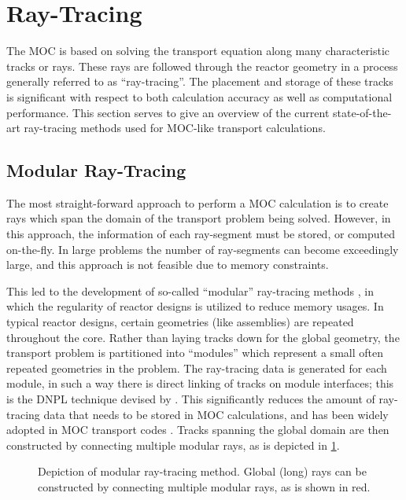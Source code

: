 {    \section{Ray-Tracing}{\label{sec:MOC:Ray-Tracing}
      The \acf{MOC} \cite{Askew1972} is based on solving the transport equation along many characteristic tracks or rays.
      These rays are followed through the reactor geometry in a process generally referred to as ``ray-tracing''.
      The placement and storage of these tracks is significant with respect to both calculation accuracy as well as computational performance.
      This section serves to give an overview of the current state-of-the-art ray-tracing methods used for \ac{MOC}-like transport calculations.

      \subsection{Modular Ray-Tracing}{\label{ssec:RT:Modular Ray-Tracing}
        The most straight-forward approach to perform a \ac{MOC} calculation is to create rays which span the domain of the transport problem being solved.
        However, in this approach, the information of each ray-segment must be stored, or computed on-the-fly.
        In large problems the number of ray-segments can become exceedingly large, and this approach is not feasible due to memory constraints.

        This led to the development of so-called ``modular'' ray-tracing methods \cite{Filippone1980,Saji2000,Wu2003,Kochunas2013}, in which the regularity of reactor designs is utilized to reduce memory usages.
        In typical reactor designs, certain geometries (like assemblies) are repeated throughout the core.
        Rather than laying tracks down for the global geometry, the transport problem is partitioned into ``modules'' which represent a small often repeated geometries in the problem.
        The ray-tracing data is generated for each module, in such a way there is direct linking of tracks on module interfaces; this is the \ac{DNPL} technique devised by \citet{Saji2000}.
        This significantly reduces the amount of ray-tracing data that needs to be stored in \ac{MOC} calculations, and has been widely adopted in \ac{MOC} transport codes \cite{Hong1998,Jung2009,Tang2009,DeCART,APOLLO3,MPACT2016,Hebert2017a}.
        Tracks spanning the global domain are then constructed by connecting multiple modular rays, as is depicted in \cref{fig:MRT:Modular Ray Tracing}.

        \begin{figure}[h]
            \centering
            \def\svgwidth{0.4\linewidth}
            
            \caption{Depiction of modular ray-tracing method. Global (long) rays can be constructed by connecting multiple modular rays, as is shown in red.}
            \label{fig:MRT:Modular Ray Tracing}
        \end{figure}

}}}
